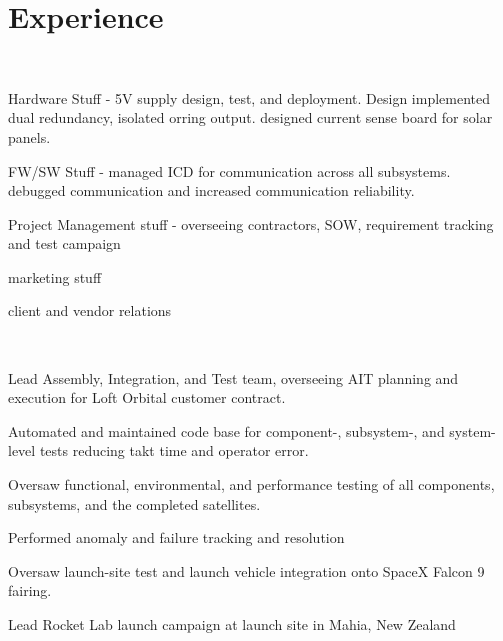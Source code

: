 \documentclass[]{hieudo-build}
\begin{document}
\begin{minipage}[t]{0.76\textwidth} 

\section{Experience}
 \\
\vspace{0.6em} %
\begin{tightemize}
\item  Hardware Stuff - 5V supply design, test, and deployment. Design implemented dual redundancy, isolated orring output. designed current sense board for solar panels. 
\item FW/SW Stuff - managed ICD for communication across all subsystems. debugged communication and increased communication reliability. 
\item Project Management stuff - overseeing contractors, SOW, requirement tracking and test campaign 
\item marketing stuff
\item client and vendor relations
\end{tightemize}
\sectionsep

 \\
\begin{tightemize}
\item Lead Assembly, Integration, and Test team, overseeing AIT planning and execution for Loft Orbital customer contract. 
\item Automated and maintained code base for component-, subsystem-, and system-level tests reducing takt time and operator error. 
\item Oversaw functional, environmental, and performance testing of all components, subsystems, and the completed satellites.
\item Performed anomaly and failure tracking and resolution
\item Oversaw launch-site test and launch vehicle integration onto SpaceX Falcon 9 fairing.
\item Lead Rocket Lab launch campaign at launch site in Mahia, New Zealand 
\end{tightemize}
\sectionsep 


\end{minipage}
\end{document}
